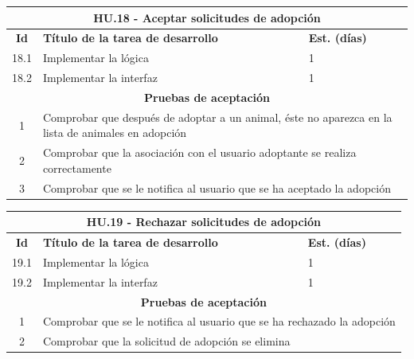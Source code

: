 \begin{table}[H]
	\centering
\begin{tabular}{|c|p{9.5cm}|p{1cm}|}
	\hline
	\multicolumn{3}{|c|}{\textbf{HU.18 - Aceptar solicitudes de adopción}} \\
	\hline
	\textbf{Id} & \textbf{Título de la tarea de desarrollo} & \textbf{Est. (días)} \\
	\hline
	18.1 &  Implementar la lógica & 1 \\ \hline
	18.2 &  Implementar la interfaz & 1 \\ \hline
	\multicolumn{3}{|c|}{\textbf{Pruebas de aceptación}} \\ \hline
	1 & \multicolumn{2}{|p{12cm}|}{Comprobar que después de adoptar a un animal, éste no aparezca en la lista de animales en adopción} \\ \hline
	2 & \multicolumn{2}{|p{12cm}|}{Comprobar que la asociación con el usuario adoptante se realiza correctamente} \\ \hline
	3 & \multicolumn{2}{|p{12cm}|}{Comprobar que se le notifica al usuario que se ha aceptado la adopción} \\ \hline

	
\end{tabular} 
\end{table}

\begin{table}[H]
	\centering
\begin{tabular}{|c|p{9.5cm}|p{1cm}|}
	\hline
	\multicolumn{3}{|c|}{\textbf{HU.19 - Rechazar solicitudes de adopción}} \\
	\hline
	\textbf{Id} & \textbf{Título de la tarea de desarrollo} & \textbf{Est. (días)} \\
	\hline
	19.1 &  Implementar la lógica & 1 \\ \hline
	19.2 &  Implementar la interfaz & 1 \\ \hline
	\multicolumn{3}{|c|}{\textbf{Pruebas de aceptación}} \\ \hline
	1 & \multicolumn{2}{|p{12cm}|}{Comprobar que se le notifica al usuario que se ha rechazado la adopción} \\ \hline
	2 & \multicolumn{2}{|p{12cm}|}{Comprobar que la solicitud de adopción se elimina} \\ \hline
	
	
\end{tabular}
\end{table}

